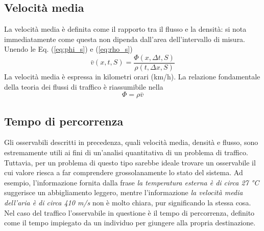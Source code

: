 \subsection{Velocit\`a media}
La velocit\`a media \`e definita come il rapporto tra il flusso e la densit\`a: si nota immediatamente come questa non dipenda dall'area dell'intervallo di misura.
Unendo le Eq. (\ref{eq:phi_s}) e (\ref{eq:rho_s})
\begin{equation}
    \bar{v}(x, t, S)=\frac{\Phi(x, \Delta t, S)}{\rho(t,\Delta x, S)}
\end{equation}
La velocit\`a media \`e espressa in kilometri orari (km/h).
La relazione fondamentale della teoria dei flussi di traffico \`e riassumibile nella
\begin{equation}
    \Phi=\rho\bar{v}
    \label{eq:fundamental}
\end{equation}

\subsection{Tempo di percorrenza}
Gli osservabili descritti in precedenza, quali velocit\`a media, densit\`a e flusso, sono estremamente utili ai fini di un'analisi quantitativa di un problema di traffico.
Tuttavia, per un problema di questo tipo sarebbe ideale trovare un osservabile il cui valore riesca a far comprendere grossolanamente lo stato del sistema.
Ad esempio, l'informazione fornita dalla frase \emph{la temperatura esterna \`e di circa 27 °C} suggerisce un abbigliamento leggero, mentre l'informazione \emph{la velocit\`a media dell'aria \`e di circa 410 m/s} non \`e molto chiara, pur significando la stessa cosa.
Nel caso del traffico l'osservabile in questione \`e il tempo di percorrenza, definito come il tempo impiegato da un individuo per giungere alla propria destinazione.

